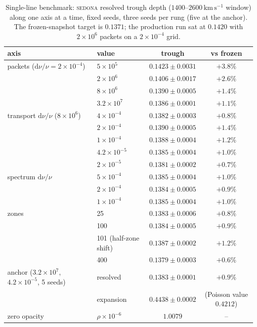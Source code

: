 \documentclass[fleqn,usenatbib]{mnras}
\newcommand{\kms}{\,\mathrm{km\,s^{-1}}}
\begin{document}
\begin{table}
\centering
\small
\caption{Single-line benchmark: \textsc{sedona} resolved trough depth
($1400$--$2600\kms$ window) along one axis at a time, fixed seeds, three
seeds per rung (five at the anchor). The frozen-snapshot target is
$0.1371$; the production run sat at $0.1420$ with $2\times10^6$ packets
on a $2\times10^{-4}$ grid.}
\label{tab:ladder}
\begin{tabular}{@{}llcc@{}}
\toprule
axis & value & trough & vs frozen \\
\midrule
packets ($\mathrm{d}\nu/\nu=2\times10^{-4}$) & $5\times10^5$ & $0.1423\pm0.0031$ & $+3.8\%$ \\
 & $2\times10^6$ & $0.1406\pm0.0017$ & $+2.6\%$ \\
 & $8\times10^6$ & $0.1390\pm0.0005$ & $+1.4\%$ \\
 & $3.2\times10^7$ & $0.1386\pm0.0001$ & $+1.1\%$ \\
transport $\mathrm{d}\nu/\nu$ ($8\times10^6$) & $4\times10^{-4}$ & $0.1382\pm0.0003$ & $+0.8\%$ \\
 & $2\times10^{-4}$ & $0.1390\pm0.0005$ & $+1.4\%$ \\
 & $1\times10^{-4}$ & $0.1388\pm0.0004$ & $+1.2\%$ \\
 & $4.2\times10^{-5}$ & $0.1385\pm0.0004$ & $+1.0\%$ \\
 & $2\times10^{-5}$ & $0.1381\pm0.0002$ & $+0.7\%$ \\
spectrum $\mathrm{d}\nu/\nu$ & $5\times10^{-4}$ & $0.1385\pm0.0004$ & $+1.0\%$ \\
 & $2\times10^{-4}$ & $0.1384\pm0.0005$ & $+0.9\%$ \\
 & $1\times10^{-4}$ & $0.1385\pm0.0004$ & $+1.0\%$ \\
zones & 25 & $0.1383\pm0.0006$ & $+0.8\%$ \\
 & 100 & $0.1384\pm0.0005$ & $+0.9\%$ \\
 & 101 (half-zone shift) & $0.1387\pm0.0002$ & $+1.2\%$ \\
 & 400 & $0.1379\pm0.0003$ & $+0.6\%$ \\
anchor ($3.2\times10^7$, $4.2\times10^{-5}$, 5 seeds) & resolved & $0.1383\pm0.0001$ & $+0.9\%$ \\
 & expansion & $0.4438\pm0.0002$ & (Poisson value $0.4212$) \\
zero opacity & $\rho\times10^{-6}$ & $1.0079$ & -- \\
\bottomrule
\end{tabular}
\end{table}
\end{document}
